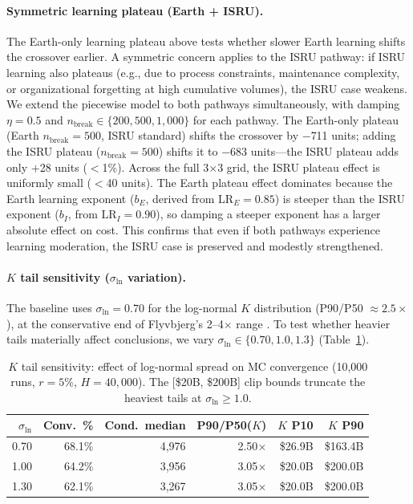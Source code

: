 \documentclass[preprint,12pt]{elsarticle}
\begin{document}
\paragraph{Symmetric learning plateau (Earth + ISRU).} The Earth-only learning plateau above tests whether slower Earth learning shifts the crossover earlier. A symmetric concern applies to the ISRU pathway: if ISRU learning also plateaus (e.g., due to process constraints, maintenance complexity, or organizational forgetting at high cumulative volumes), the ISRU case weakens. We extend the piecewise model to both pathways simultaneously, with damping $\eta = 0.5$ and $n_{\mathrm{break}} \in \{200, 500, 1{,}000\}$ for each pathway. The Earth-only plateau (Earth $n_{\mathrm{break}} = 500$, ISRU standard) shifts the crossover by $-$711 units; adding the ISRU plateau ($n_{\mathrm{break}} = 500$) shifts it to $-$683 units---the ISRU plateau adds only $+$28 units ($<$1\%). Across the full 3$\times$3 grid, the ISRU plateau effect is uniformly small ($<$40 units). The Earth plateau effect dominates because the Earth learning exponent ($b_E$, derived from $\mathrm{LR}_E = 0.85$) is steeper than the ISRU exponent ($b_I$, from $\mathrm{LR}_I = 0.90$), so damping a steeper exponent has a larger absolute effect on cost. This confirms that even if both pathways experience learning moderation, the ISRU case is preserved and modestly strengthened.

\paragraph{$K$ tail sensitivity ($\sigma_{\ln}$ variation).} The baseline uses $\sigma_{\ln} = 0.70$ for the log-normal $K$ distribution (P90/P50 $\approx 2.5\times$), at the conservative end of Flyvbjerg's 2--4$\times$ range \cite{flyvbjerg2014}. To test whether heavier tails materially affect conclusions, we vary $\sigma_{\ln} \in \{0.70, 1.0, 1.3\}$ (Table~\ref{tab:sigma_ln}).

\begin{table}[htbp]
\centering
\caption{$K$ tail sensitivity: effect of log-normal spread on MC convergence (10{,}000 runs, $r = 5\%$, $H = 40{,}000$). The [\$20B, \$200B] clip bounds truncate the heaviest tails at $\sigma_{\ln} \geq 1.0$.}
\label{tab:sigma_ln}
\small
\begin{tabular}{@{}rrrrrr@{}}
\toprule
$\sigma_{\ln}$ & Conv.\ \% & Cond.\ median & P90/P50($K$) & $K$ P10 & $K$ P90 \\
\midrule
0.70 & 68.1\% & 4{,}976 & 2.50$\times$ & \$26.9B & \$163.4B \\
1.00 & 64.2\% & 3{,}956 & 3.05$\times$ & \$20.0B & \$200.0B \\
1.30 & 62.1\% & 3{,}267 & 3.05$\times$ & \$20.0B & \$200.0B \\
\bottomrule
\end{tabular}
\end{table}
\end{document}
